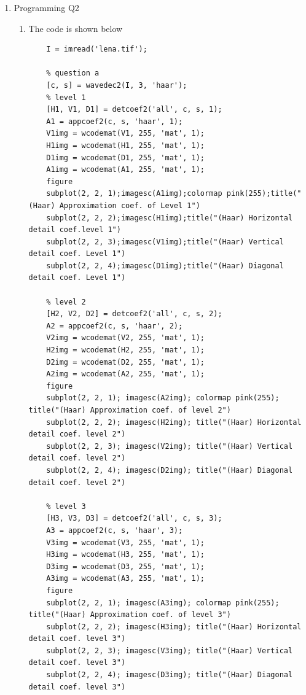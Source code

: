 \documentclass[12pt]{article}
\begin{document}
\begin{enumerate}[1]
\item Programming Q2
\begin{enumerate}
    \item The code is shown below
\begin{lstlisting}
    I = imread('lena.tif');

    % question a
    [c, s] = wavedec2(I, 3, 'haar');
    % level 1
    [H1, V1, D1] = detcoef2('all', c, s, 1);
    A1 = appcoef2(c, s, 'haar', 1);
    V1img = wcodemat(V1, 255, 'mat', 1);
    H1img = wcodemat(H1, 255, 'mat', 1);
    D1img = wcodemat(D1, 255, 'mat', 1);
    A1img = wcodemat(A1, 255, 'mat', 1);
    figure
    subplot(2, 2, 1);imagesc(A1img);colormap pink(255);title("(Haar) Approximation coef. of Level 1")
    subplot(2, 2, 2);imagesc(H1img);title("(Haar) Horizontal detail coef.level 1")
    subplot(2, 2, 3);imagesc(V1img);title("(Haar) Vertical detail coef. Level 1")
    subplot(2, 2, 4);imagesc(D1img);title("(Haar) Diagonal detail coef. Level 1")

    % level 2
    [H2, V2, D2] = detcoef2('all', c, s, 2);
    A2 = appcoef2(c, s, 'haar', 2);
    V2img = wcodemat(V2, 255, 'mat', 1);
    H2img = wcodemat(H2, 255, 'mat', 1);
    D2img = wcodemat(D2, 255, 'mat', 1);
    A2img = wcodemat(A2, 255, 'mat', 1);
    figure
    subplot(2, 2, 1); imagesc(A2img); colormap pink(255); title("(Haar) Approximation coef. of level 2")
    subplot(2, 2, 2); imagesc(H2img); title("(Haar) Horizontal detail coef. level 2")
    subplot(2, 2, 3); imagesc(V2img); title("(Haar) Vertical detail coef. level 2")
    subplot(2, 2, 4); imagesc(D2img); title("(Haar) Diagonal detail coef. level 2")

    % level 3
    [H3, V3, D3] = detcoef2('all', c, s, 3);
    A3 = appcoef2(c, s, 'haar', 3);
    V3img = wcodemat(V3, 255, 'mat', 1);
    H3img = wcodemat(H3, 255, 'mat', 1);
    D3img = wcodemat(D3, 255, 'mat', 1);
    A3img = wcodemat(A3, 255, 'mat', 1);
    figure
    subplot(2, 2, 1); imagesc(A3img); colormap pink(255); title("(Haar) Approximation coef. of level 3")
    subplot(2, 2, 2); imagesc(H3img); title("(Haar) Horizontal detail coef. level 3")
    subplot(2, 2, 3); imagesc(V3img); title("(Haar) Vertical detail coef. level 3")
    subplot(2, 2, 4); imagesc(D3img); title("(Haar) Diagonal detail coef. level 3")
\end{lstlisting}


\end{enumerate}
\end{enumerate}
\end{document}
